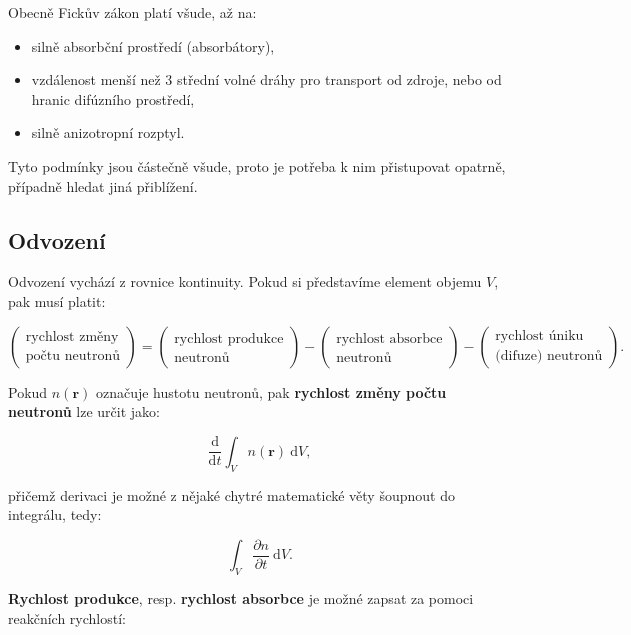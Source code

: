 Obecně Fickův zákon platí všude, až na:

\begin{itemize}
    \item silně absorbční prostředí (absorbátory),
    \item vzdálenost menší než 3 střední volné dráhy pro transport od zdroje, nebo od hranic difúzního prostředí,
    \item silně anizotropní rozptyl.
\end{itemize}

Tyto podmínky jsou částečně všude, proto je potřeba k nim přistupovat opatrně, případně hledat jiná přiblížení.

\subsection{Odvození}

Odvození vychází z rovnice kontinuity. Pokud si představíme element objemu $V$, pak musí platit:

\begin{equation*}
    \boxed{
    \begin{pmatrix} \text{rychlost změny} \\ \text{počtu neutronů} \end{pmatrix} = \begin{pmatrix} \text{rychlost produkce} \\ \text{neutronů} \end{pmatrix} - \begin{pmatrix} \text{rychlost absorbce} \\ \text{neutronů} \end{pmatrix} - \begin{pmatrix} \text{rychlost úniku} \\ \text{(difuze) neutronů} \end{pmatrix}.
    }
\end{equation*}

Pokud $n(\textbf{r})$ označuje hustotu neutronů, pak \textbf{rychlost změny počtu neutronů} lze určit jako:

$$ \dfrac{\text{d}}{\text{d}t} \int_V n(\textbf{r}) \: \text{d} V, $$

přičemž derivaci je možné z nějaké chytré matematické věty šoupnout do integrálu, tedy:

$$ \boxed{\int_V \dfrac{\partial n}{\partial t} \: \text{d} V.} $$

\textbf{Rychlost produkce}, resp. \textbf{rychlost absorbce} je možné zapsat za pomoci reakčních rychlostí:

